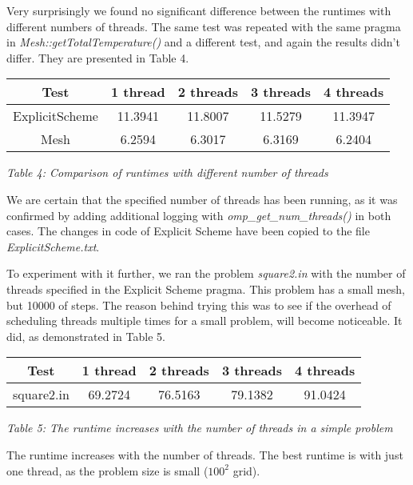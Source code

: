 \documentclass[11pt,journal]{IEEEtran}
\begin{document}
	Very surprisingly we found no significant difference between the runtimes with different numbers of threads. The same test was repeated with the same pragma in \emph{Mesh::getTotalTemperature()} and a different test, and again the results didn't differ. They are presented in Table 4.

		\begin{table}[h]
		\centering
		\begin{tabular}{|c|c|c|c|c|}
			\hline
			Test & 1 thread & 2 threads& 3 threads & 4 threads \\
			\hline
			ExplicitScheme & 11.3941 & 11.8007 & 11.5279 & 11.3947 \\
			\hline
			Mesh & 6.2594 & 6.3017 & 6.3169 &6.2404\\

			\hline
		\end{tabular}
		
		\emph{Table 4: Comparison of runtimes with different number of threads}
	\end{table}

	We are certain that the specified number of threads has been running, as it was confirmed by adding additional logging with \emph{omp\_get\_num\_threads()} in both cases. The changes in code of Explicit Scheme have been copied to the file \emph{ExplicitScheme.txt}.
	
	To experiment with it further, we ran the problem \emph{square2.in} with the number of threads specified in the Explicit Scheme pragma. This problem has a small mesh, but 10000 of steps. The reason behind trying this was to see if the overhead of scheduling threads multiple times for a small problem, will become noticeable. It did, as demonstrated in Table 5.
	
	\begin{table}[h]
		\centering
		\begin{tabular}{|c|c|c|c|c|}
			\hline
			Test & 1 thread & 2 threads& 3 threads & 4 threads \\
			\hline
			square2.in& 69.2724 & 76.5163 & 79.1382 & 91.0424 \\
			
			\hline
		\end{tabular}
		
		\emph{Table 5: The runtime increases with the number of threads in a simple problem}
	\end{table}
	
	The runtime increases with the number of threads. The best runtime is with just one thread, as the problem size is small ($100^2$ grid).
	
\end{document}
